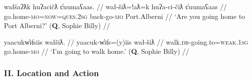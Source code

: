 \ex \label{ex:gohometoalberni}
\begingl
\glpreamble wałšaʔƛk huʔacičƛ c̓uumaʕaas. //
\gla wał-šiƛ=!aƛ=k huʔa-ci-čiƛ c̓uumaʕaas  //
\glb go.home-\textsc{mo}=\textsc{now}=\textsc{ques.2sg} back-go-\textsc{mo} Port.Alberni //
\glft `Are you going home to Port Alberni?' (\textbf{Q}, Sophie Billy) //
\endgl
\xe

\ex \label{ex:goingtowalkhome}
\begingl
\glpreamble yaacukw̓it̓siis wałšiƛ. //
\gla yaacuk-w̓it̓s=(y)iis wał-šiƛ  //
\glb walk.\textsc{dr}-going.to=\textsc{weak.1sg} go.home-\textsc{mo} //
\glft `I'm going to walk home.' (\textbf{Q}, Sophie Billy) //
\endgl
\xe

\begin{comment}
\ex \label{ex:movetovictoria1}
\begingl
\glpreamble ʔucičƛiis šiiƛuk mituunii. //
\gla ʔu-ci-čiƛ=(y)iis šiiƛuk mituunii  //
\glb \textsc{x}-go-\textsc{mo}=\textsc{weak.1sg} move.house.\textsc{dr} Victoria //
\glft `I moved to Victoria.' (\textbf{Q}, Sophie Billy) //
\endgl
\xe

[[TODO: šiiƛuk is ambiguous between PF and IMPF, so don’t use it, use one of SB’s other examples.]]

\ex~ \label{ex:movetovictoria2}
\begingl
\glpreamble ʔuuct̓iiḥiis šiiƛuk mituunii. //
\gla ʔuuct̓iiḥ=(y)iis šiiƛuk mituunii  //
\glb go.toward.\textsc{dr}=\textsc{weak.1sg} move.house.\textsc{dr} Victoria //
\glft `I moved to Victoria.' (\textbf{Q}, Sophie Billy) //
\endgl
\xe
\end{comment}

\begin{comment}
Ordering preference. One of my speakers expressed a strong preference for the manner verb to precede the action. This mirrors how adverbs are used in Nuuchahnulth, which also tend to precede the verb. Other speakers I consulted with were comfortable with the verbs coming in either order.

\ex \label{ex:gohomedrive}
\begingl
\glpreamble ʔucičƛsiš šiiƛuk mituuni. //
\gla ʔu-ci-čiƛ=siˑš šiiƛuk mituuni  //
\glb \textsc{x}-go-\textsc{mo}=\textsc{strg.1sg} move.house-\textsc{dr} Victoria //
\glft `I moved to Victoria.' (\textbf{Q}, Sophie Billy) //
\endgl
\xe
FH
*waałšiʔaƛs ƛiiƛiiḥataḥ.
waałšiʔaƛs. ƛiiƛiiḥataḥʔaƛs.
\end{comment}

\vspace{10pt}

\subsubsection{II. Location and Action} \label{ch:sv:data:type2}

